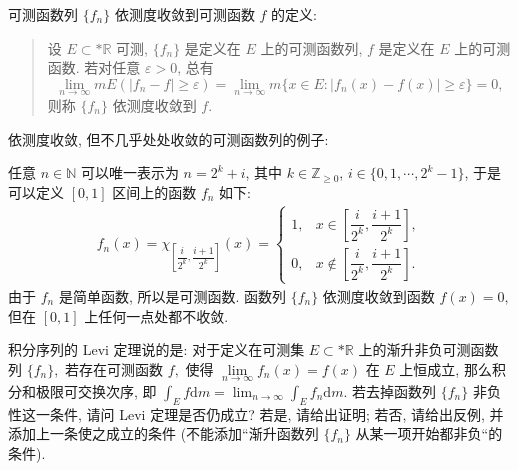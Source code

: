 \begin{solution}
  可测函数列 \(\{f_n\}\) 依测度收敛到可测函数 \(f\) 的定义: 

  \begin{quote}
  设 \(E \subset* \mathbb{R}\) 可测, \(\{f_n\}\) 是定义在 \(E\) 上的可测函数列, \(f\) 是定义在 \(E\) 上的可测函数. 若对任意 \(\varepsilon > 0\), 总有
  \[\lim\limits_{n\to\infty} m E (\lvert f_n - f \rvert \geqslant \varepsilon) = \lim\limits_{n\to\infty} m \{ x \in E \colon \lvert f_n(x) - f(x) \rvert \geqslant \varepsilon \} = 0,\]
  则称 \(\{f_n\}\) 依测度收敛到 \(f\).
  \end{quote}

  依测度收敛, 但不几乎处处收敛的可测函数列的例子: 

  任意 \(n \in \mathbb{N}\) 可以唯一表示为 \(n = 2^k + i\), 其中 \(k \in \mathbb{Z}_{\geqslant 0}\), \(i \in \{0, 1, \cdots, 2^k - 1\}\), 于是可以定义 \([0, 1]\) 区间上的函数 \(f_n\) 如下:
  \[\begin{aligned}
  f_n(x) = \chi_{\left[ \dfrac{i}{2^k}, \dfrac{i+1}{2^k} \right]}(x) = \begin{cases}
    1, & x \in \left[ \dfrac{i}{2^k}, \dfrac{i+1}{2^k} \right], \\
    0, & x \notin \left[ \dfrac{i}{2^k}, \dfrac{i+1}{2^k} \right].
  \end{cases}
  \end{aligned}\]
  由于 \(f_n\) 是简单函数, 所以是可测函数. 函数列 \(\{f_n\}\) 依测度收敛到函数 \(f(x) = 0,\) 但在 \([0, 1]\) 上任何一点处都不收敛.
\end{solution}

\begin{question}[points = 10]
  积分序列的 Levi 定理说的是: 对于定义在可测集 $E \subset* \mathbb{R}$ 上的渐升非负可测函数列 $\{f_n\},$ 若存在可测函数 $f,$ 使得 $\lim\limits_{n\to\infty} f_n(x) = f(x)$ 在 $E$ 上恒成立, 那么积分和极限可交换次序, 即 $\displaystyle \int_E f \mathrm{d} m = \lim_{n \to \infty} \int_E f_n \mathrm{d} m.$ 若去掉函数列 $\{f_n\}$ 非负性这一条件, 请问 Levi 定理是否仍成立? 若是, 请给出证明; 若否, 请给出反例, 并添加上一条使之成立的条件 (不能添加“渐升函数列 $\{f_n\}$ 从某一项开始都非负“的条件).

\end{question}

